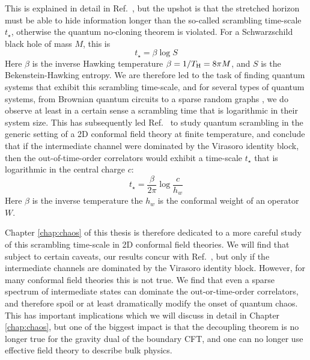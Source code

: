 \documentclass{brownthesis}
\begin{document}
This is explained in detail in Ref.~\cite{Sekino:2008he}, but the upshot is that
the stretched horizon must be able to hide information longer than the so-called
scrambling time-scale $t_\star$, otherwise the quantum no-cloning theorem is violated.
For a Schwarzschild black hole of mass $M$, this is
\[
t_\star = \beta \log S
\]
Here $\beta$ is the inverse Hawking temperature $\beta = 1/T_{\rm H} = 8\pi M$, and
$S$ is the Bekenstein-Hawking entropy. We are therefore led to the task of finding
quantum systems that exhibit this scrambling time-scale, and for several types of
quantum systems, from Brownian quantum circuits \cite{Lashkari:2011yi} to a sparse
random graphs \cite{Lashkari:2011yi, Bentsen:2018uph}, we do observe at least in a
certain sense a scrambling time that is logarithmic in their system size. This has
subsequently led Ref.~\cite{PhysRevLett.115.131603} to study quantum scrambling in
the generic setting of a 2D conformal field theory at finite temperature, and
conclude that if the intermediate channel were dominated by the Virasoro identity
block, then the out-of-time-order correlators would exhibit a time-scale $t_\star$
that is logarithmic in the central charge $c$:
\[
t_\star = \frac{\beta}{2\pi}\log\frac{c}{h_{w}}
\]
Here $\beta$ is the inverse temperature the $h_w$ is the conformal weight of
an operator $W$.

Chapter \ref{chap:chaos} of this thesis is therefore dedicated to a more careful
study of this scrambling time-scale in 2D conformal field theories. We will find that
subject to certain caveats, our results concur with Ref.~\cite{PhysRevLett.115.131603},
but only if the intermediate channels are dominated by the Virasoro identity block.
However, for many conformal field theories this is not true. We find that
even a sparse spectrum of intermediate states can dominate the out-or-time-order
correlators, and therefore spoil or at least dramatically modify the onset of
quantum chaos. This has important implications which we will discuss in detail in
Chapter \ref{chap:chaos}, but one of the biggest impact is that the decoupling
theorem is no longer true for the gravity dual of the boundary CFT, and one can
no longer use effective field theory to describe bulk physics.
\end{document}
